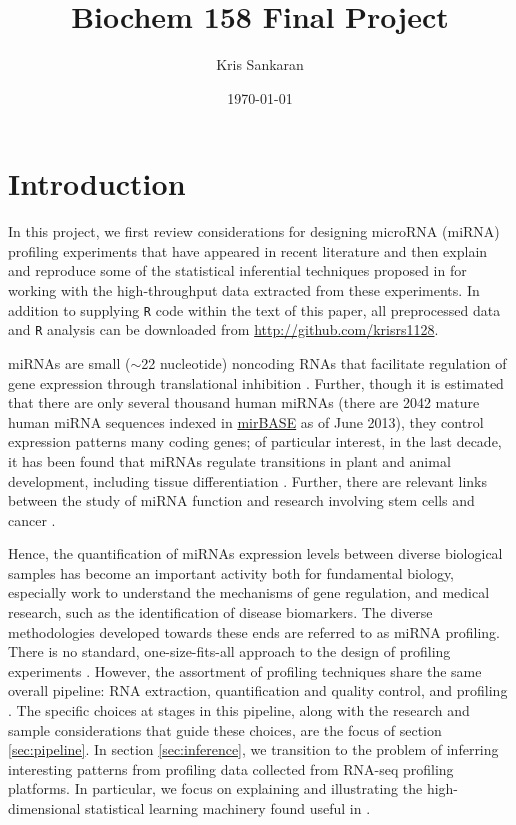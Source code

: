 \documentclass[12pt,english]{article}\usepackage{graphicx, color}
\author{Kris Sankaran}
\date{\today}
\title{Biochem 158 Final Project}
\numberwithin{equation}{section}
\numberwithin{figure}{section}
\theoremstyle{plain}
\theoremstyle{remark}
\begin{document}
\maketitle

\section{Introduction}

In this project, we first review considerations for designing microRNA
(miRNA) profiling experiments that have appeared in recent literature
and then  explain and reproduce some of the statistical inferential
techniques proposed in \cite{witten2010ultra} for working with the
high-throughput data extracted from these experiments. In addition to
supplying \texttt{R} code within the text of this paper, all
preprocessed data and \texttt{R} analysis can be downloaded from
\href{http://github.com/krisrs1128}{http://github.com/krisrs1128}.

miRNAs are small ($\sim$22 nucleotide) noncoding RNAs that
facilitate regulation of gene expression through translational
inhibition \cite{kong2009strategies, pritchard2012microrna}. Further,
though it is estimated that there are only several thousand human
miRNAs (there are 2042 mature human miRNA sequences indexed in
\href{http://www.mirbase.org/cgi-bin/browse.pl?org=hsa}{mirBASE} as of
June 2013), they control expression patterns many coding genes; of
particular interest, in the last decade, it has been found
that miRNAs regulate transitions in plant and animal development,
including tissue differentiation \cite{ohnishi2010small,
  zhou2007mir, grosshans2005temporal}. Further, there are relevant
links between the study of miRNA function and research involving stem
cells and cancer \cite{alvarez2005microrna,   calin2006microrna,
  volinia2006microrna}.

Hence, the quantification of miRNAs expression levels between
diverse biological samples has become an important activity both for
fundamental biology, especially work to understand the mechanisms of
gene regulation, and medical research, such as the
identification of disease biomarkers. The diverse methodologies
developed towards these ends are referred to as miRNA profiling. There
is no standard, one-size-fits-all approach to the design of profiling
experiments \cite{kong2009strategies, pritchard2012microrna}. However, the
assortment of profiling techniques share the same overall pipeline:
RNA extraction, quantification and quality control, and profiling
\cite{pritchard2012microrna}. The specific choices at stages in this
pipeline, along with the research and sample considerations that guide
these choices, are the focus of section \ref{sec:pipeline}. In section
\ref{sec:inference}, we transition to the problem of inferring
interesting patterns from profiling data collected from RNA-seq
profiling platforms. In particular, we focus on explaining and
illustrating the high-dimensional statistical learning machinery found
useful in \cite{witten2010ultra}.
\end{document}

